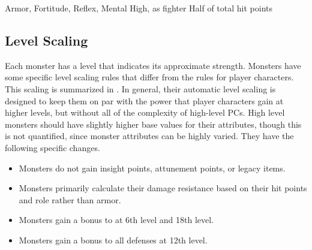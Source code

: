               Armor,  Fortitude,  Reflex,  Mental
             High, as fighter
             Half of total hit points

    \subsection{Level Scaling}
        Each monster has a level that indicates its approximate strength.
        Monsters have some specific level scaling rules that differ from the rules for player characters.
        This scaling is summarized in .
        In general, their automatic level scaling is designed to keep them on par with the power that player characters gain at higher levels, but without all of the complexity of high-level PCs.
        High level monsters should have slightly higher base values for their attributes, though this is not quantified, since monster attributes can be highly varied.
        They have the following specific changes.
        \begin{itemize}
            \item Monsters do not gain insight points, attunement points, or legacy items.
            \item Monsters primarily calculate their damage resistance based on their hit points and role rather than armor.
            \item Monsters gain a  bonus to  at 6th level and 18th level.
            \item Monsters gain a  bonus to all defenses at 12th level.
        \end{itemize}

